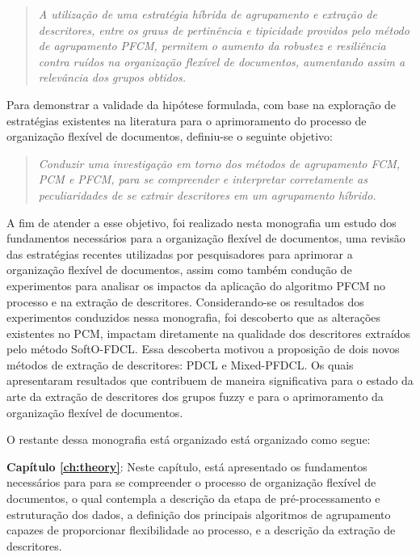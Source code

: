\begin{quote}
\textit{A utilização de uma estratégia híbrida de agrupamento e extração de descritores, entre os 
  graus de pertinência e tipicidade providos pelo método de agrupamento PFCM, permitem o aumento da
    robustez e resiliência contra ruídos na organização flexível de documentos, aumentando assim a
    relevância dos grupos obtidos.}
\end{quote}

Para demonstrar a validade da hipótese formulada, com base na exploração de estratégias existentes
na literatura para o aprimoramento do processo de organização flexível de documentos, definiu-se o seguinte objetivo: 

\begin{quote}
\textit{Conduzir uma investigação em torno dos métodos de agrupamento FCM, PCM e PFCM, para
se compreender e interpretar corretamente as peculiaridades de se extrair descritores em um
agrupamento híbrido.}
\end{quote}

A fim de atender a esse objetivo, foi realizado nesta monografia um estudo dos fundamentos
necessários para a organização flexível de documentos, uma revisão das estratégias recentes
utilizadas por pesquisadores para aprimorar a organização flexível de documentos, assim como também
condução de experimentos para analisar os impactos da aplicação do algoritmo PFCM no processo e na
extração de descritores. Considerando-se os resultados dos experimentos conduzidos nessa monografia,
foi descoberto que as alterações existentes no PCM, impactam diretamente na qualidade dos
descritores extraídos pelo método SoftO-FDCL. Essa descoberta motivou a proposição de dois novos
métodos de extração de descritores: PDCL e Mixed-PFDCL. Os quais apresentaram resultados que
contribuem de maneira significativa para o estado da arte da extração de descritores dos grupos
fuzzy e para o aprimoramento da organização flexível de documentos.

O restante dessa monografia está organizado está organizado como segue:

{\bf Capítulo \ref{ch:theory}\/}: Neste capítulo, está apresentado os fundamentos necessários para para
se compreender o processo de organização flexível de documentos, o qual contempla a descrição da
etapa de pré-processamento e estruturação dos dados, a definição dos principais algoritmos de
agrupamento capazes de proporcionar flexibilidade ao processo, e a descrição da extração de
descritores.

